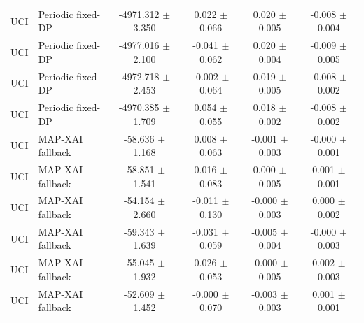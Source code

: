 \begin{tabular}{llcccc}
UCI & Periodic fixed-DP & -4971.312 $\pm$ 3.350 & 0.022 $\pm$ 0.066 & 0.020 $\pm$ 0.005 & -0.008 $\pm$ 0.004 \\
UCI & Periodic fixed-DP & -4977.016 $\pm$ 2.100 & -0.041 $\pm$ 0.062 & 0.020 $\pm$ 0.004 & -0.009 $\pm$ 0.005 \\
UCI & Periodic fixed-DP & -4972.718 $\pm$ 2.453 & -0.002 $\pm$ 0.064 & 0.019 $\pm$ 0.005 & -0.008 $\pm$ 0.002 \\
UCI & Periodic fixed-DP & -4970.385 $\pm$ 1.709 & 0.054 $\pm$ 0.055 & 0.018 $\pm$ 0.002 & -0.008 $\pm$ 0.002 \\
UCI & MAP-XAI fallback & -58.636 $\pm$ 1.168 & 0.008 $\pm$ 0.063 & -0.001 $\pm$ 0.003 & -0.000 $\pm$ 0.001 \\
UCI & MAP-XAI fallback & -58.851 $\pm$ 1.541 & 0.016 $\pm$ 0.083 & 0.000 $\pm$ 0.005 & 0.001 $\pm$ 0.001 \\
UCI & MAP-XAI fallback & -54.154 $\pm$ 2.660 & -0.011 $\pm$ 0.130 & -0.000 $\pm$ 0.003 & 0.000 $\pm$ 0.002 \\
UCI & MAP-XAI fallback & -59.343 $\pm$ 1.639 & -0.031 $\pm$ 0.059 & -0.005 $\pm$ 0.004 & -0.000 $\pm$ 0.003 \\
UCI & MAP-XAI fallback & -55.045 $\pm$ 1.932 & 0.026 $\pm$ 0.053 & -0.000 $\pm$ 0.005 & 0.002 $\pm$ 0.003 \\
UCI & MAP-XAI fallback & -52.609 $\pm$ 1.452 & -0.000 $\pm$ 0.070 & -0.003 $\pm$ 0.003 & 0.001 $\pm$ 0.001 \\
\bottomrule
\end{tabular}
